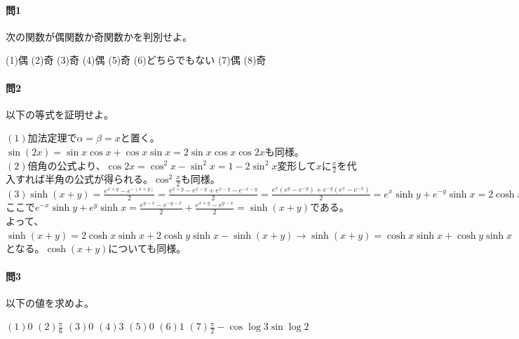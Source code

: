 \documentclass[a4j,dvipdfmx]{jsarticle}
\begin{document}
                \paragraph{問1}次の関数が偶関数か奇関数かを判別せよ。

                \noindent
                (1)偶\hspace{3mm}
                (2)奇\hspace{3mm}
                (3)奇\hspace{3mm}
                (4)偶\hspace{3mm}
                (5)奇\hspace{3mm}
                (6)どちらでもない\hspace{3mm}
                (7)偶\hspace{3mm}
                (8)奇

                \paragraph{問2}以下の等式を証明せよ。

                \noindent
                $(1)$加法定理で$\alpha=\beta=x$と置く。$\sin(2x)=\sin x\cos x+\cos x\sin x=2\sin x\cos x$\hspace{1mm}$\cos 2x$も同様。\\
                $(2)$倍角の公式より、$\cos 2x=\cos^2 x-\sin^2 x=1-2\sin^2 x$変形して$x$に$\frac{x}{2}$を代入すれば半角の公式が得られる。$\cos^2 \frac{x}{2}$も同様。\\
                $\displaystyle(3)\sinh(x+y)=\frac{e^{x+y}-e^{-(x+y)}}{2}=\frac{e^{x+y}-e^{x-y}+e^{x-y}-e^{-x-y}}{2}=\frac{e^{x}(e^{y}-e^{-y})+e^{-y}(e^x-e^{-x})}{2}=e^x\sinh y+e^{-y}\sinh x=2\cosh x\sinh y -e^{-x}\sinh y+2\cosh y\sinh x -e^{y}\sinh x$\\
                ここで$\displaystyle e^{-x}\sinh y+e^{y}\sinh x=\frac{e^{y-x}-e^{-y-x}}{2}+\frac{e^{x+y}-e^{y-x}}{2}=\sinh(x+y)$である。\\
                よって、$\displaystyle \sinh (x+y)=2\cosh x\sinh x+2\cosh y\sinh x-\sinh (x+y)\to \sinh(x+y)=\cosh x\sinh x+\cosh y\sinh x$となる。$\cosh (x+y)$についても同様。
                
                \paragraph{問3}以下の値を求めよ。

                \noindent
                $(1)0$\hspace{3mm}
                $(2)\frac{\pi}{6}$\hspace{3mm}
                $(3)0$\hspace{3mm}
                $(4)3$\hspace{3mm}
                $(5)0$\hspace{3mm}
                $(6)1$\hspace{3mm}
                $(7)\frac{\pi}{2}-\cos\log 3\sin\log 2$
                
\end{document}
